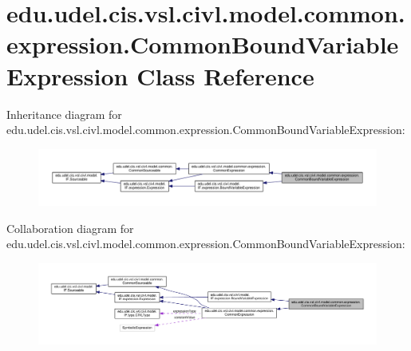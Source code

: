 \hypertarget{classedu_1_1udel_1_1cis_1_1vsl_1_1civl_1_1model_1_1common_1_1expression_1_1CommonBoundVariableExpression}{}\section{edu.\+udel.\+cis.\+vsl.\+civl.\+model.\+common.\+expression.\+Common\+Bound\+Variable\+Expression Class Reference}
\label{classedu_1_1udel_1_1cis_1_1vsl_1_1civl_1_1model_1_1common_1_1expression_1_1CommonBoundVariableExpression}


Inheritance diagram for edu.\+udel.\+cis.\+vsl.\+civl.\+model.\+common.\+expression.\+Common\+Bound\+Variable\+Expression\+:
\nopagebreak
\begin{figure}[H]
\begin{center}
\leavevmode
\includegraphics[width=350pt]{classedu_1_1udel_1_1cis_1_1vsl_1_1civl_1_1model_1_1common_1_1expression_1_1CommonBoundVariableExpression__inherit__graph}
\end{center}
\end{figure}


Collaboration diagram for edu.\+udel.\+cis.\+vsl.\+civl.\+model.\+common.\+expression.\+Common\+Bound\+Variable\+Expression\+:
\nopagebreak
\begin{figure}[H]
\begin{center}
\leavevmode
\includegraphics[width=350pt]{classedu_1_1udel_1_1cis_1_1vsl_1_1civl_1_1model_1_1common_1_1expression_1_1CommonBoundVariableExpression__coll__graph}
\end{center}
\end{figure}

